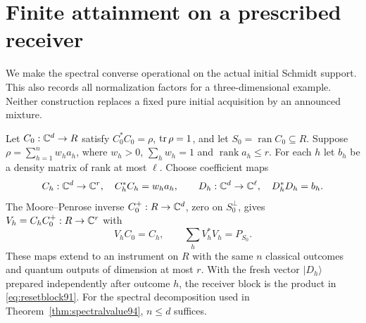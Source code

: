\section{Finite attainment on a prescribed receiver}
\label{sec:attainment96}
We make the spectral converse operational on the actual initial
Schmidt support.  This also records all normalization factors for a
three-dimensional example.  Neither construction replaces a fixed
pure initial acquisition by an announced mixture.

\begin{proposition}
\label{prop:finiteinstrument96}
Let $C_0:\mathbb C^d\to R$ satisfy $C_0^*C_0=\rho$, $\operatorname{tr}\rho=1$, and
let $S_0=\operatorname{ran}C_0\subseteq R$.  Suppose
$\rho=\sum_{h=1}^n w_h a_h$, where $w_h>0$, $\sum_hw_h=1$ and
$\operatorname{rank}a_h\le r$.  For each $h$ let $b_h$ be a density
matrix of rank at most $\ell$.  Choose coefficient maps
\[
 C_h:\mathbb C^d\to\mathbb C^r,\quad C_h^*C_h=w_ha_h,
 \qquad D_h:\mathbb C^d\to\mathbb C^\ell,\quad D_h^*D_h=b_h.
\]
The Moore--Penrose inverse $C_0^+:R\to\mathbb C^d$, zero on $S_0^\perp$,
gives $V_h=C_hC_0^+:R\to\mathbb C^r$ with
\begin{equation}\label{eq:finiteinstrument96}
 V_hC_0=C_h,\qquad \sum_h V_h^*V_h=P_{S_0}.
\end{equation}
These maps extend to an instrument on $R$ with the same $n$ classical
outcomes and quantum outputs of dimension at most $r$.  With the fresh
vector $|D_h\rangle$ prepared independently after outcome $h$, the
receiver block is the product in \eqref{eq:resetblock91}.
For the spectral decomposition used in
Theorem~\ref{thm:spectralvalue94}, $n\le d$ suffices.
\end{proposition}
